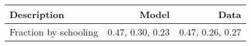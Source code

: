 \begin{tabular}{lrr}
\hline
Description & Model  & Data  \\ 
\hline
Fraction by schooling & 0.47, 0.30, 0.23  & 0.47, 0.26, 0.27  \\ 
\hline
\end{tabular}%
